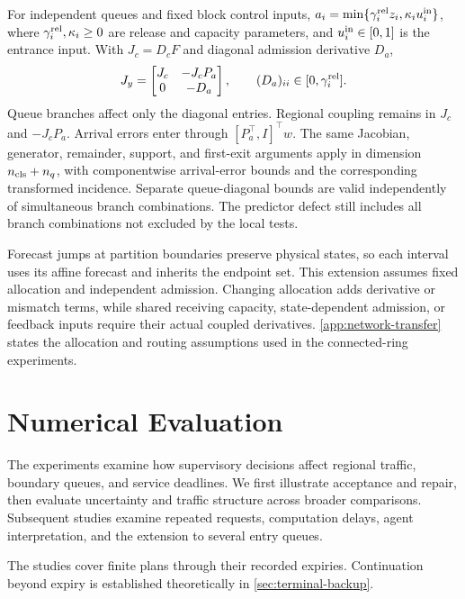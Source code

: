 \documentclass[preprint,12pt]{elsarticle}
\theoremstyle{definition}
\theoremstyle{plain}
\theoremstyle{definition}
\theoremstyle{plain}
\newcommand{\appref}[1]{\ref{#1}}
\begin{document}
For independent queues and fixed block control inputs,
$a_i=\min\{\gamma_i^{\rm rel}z_i,\kappa_i u_i^{\rm in}\}$, where
$\gamma_i^{\rm rel},\kappa_i\ge0$ are release and capacity parameters,
and $u_i^{\rm in}\in[0,1]$ is the entrance input. With
$J_c=D_cF$ and diagonal admission derivative $D_a$,
\begin{equation}
 J_y=\begin{bmatrix}J_c&-J_cP_a\\0&-D_a\end{bmatrix},
 \qquad (D_a)_{ii}\in[0,\gamma_i^{\rm rel}].
 \label{eq:network-jacobian}
\end{equation}
Queue branches affect only the diagonal entries. Regional coupling remains
in $J_c$ and $-J_cP_a$. Arrival errors enter through
$[P_a^\top,I]^\top w$. The same Jacobian, generator, remainder, support,
and first-exit arguments apply in dimension $n_{\rm cls}+n_q$, with componentwise
arrival-error bounds and the corresponding transformed incidence.
Separate queue-diagonal bounds are valid independently of simultaneous
branch combinations. The predictor defect still includes all branch
combinations not excluded by the local tests.

Forecast jumps at partition boundaries preserve physical states, so each
interval uses its affine forecast and inherits the endpoint set. This
extension assumes fixed allocation and independent admission. Changing
allocation adds derivative or mismatch terms, while shared receiving
capacity, state-dependent admission, or feedback inputs require their actual
coupled derivatives. \appref{app:network-transfer} states the allocation and routing
assumptions used in the connected-ring experiments.

\section{Numerical Evaluation}
\label{sec:new-evidence}

The experiments examine how supervisory decisions affect regional traffic,
boundary queues, and service deadlines. We first illustrate acceptance
and repair, then evaluate uncertainty and traffic structure across broader
comparisons. Subsequent studies examine repeated requests, computation
delays, agent interpretation, and the extension to several entry queues.

The studies cover finite plans through their recorded expiries.
Continuation beyond expiry is established theoretically in
\appref{sec:terminal-backup}.
\end{document}
